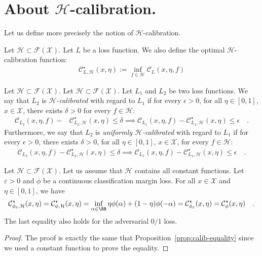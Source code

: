 \section{About $\mathcal{H}$-calibration.}

Let us  define more precisely the notion of $\mathcal{H}$-calibration.

\begin{defn}
Let $\mathcal{H}\subset \mathcal{F}(\mathcal{X})$. Let $L$ be a loss function. We also define the optimal $\mathcal{H}$-calibration function:
\begin{align*}
        \mathcal{C}^\star_{L,\mathcal{H}}(x,\eta):=\inf_{f\in\mathcal{H}}\mathcal{C}_L(x,\eta,f)
\end{align*}

\end{defn}



\begin{defn}
Let $\mathcal{H}\subset \mathcal{F}(\mathcal{X})$. Let $\mathcal{H}\subset \mathcal{F}(\mathcal{X})$. Let $L_1$ and $L_2$ be two loss functions. We say that $L_2$ is \emph{$\mathcal{H}$-calibrated} with regard to $L_1$ if for every $\epsilon>0$,  for all $\eta\in[0,1]$, $x\in\mathcal{X}$, there exists $ \delta>0$ for every $f\in\mathcal{H}$: 
\begin{align*}
    \mathcal{C}_{L_2}(x,\eta,f)- &\mathcal{C}^\star_{L_2,\mathcal{H}}(x,\eta)\leq\delta\implies\mathcal{C}_{L_1}(x,\eta,f)- \mathcal{C}^\star_{L_1,\mathcal{H}}(x,\eta)\leq \epsilon\quad.
\end{align*}
Furthermore, we say that $L_2$ is \emph{uniformly $\mathcal{H}$-calibrated} with regard to $L_1$ if for every $\epsilon>0$, there exists $ \delta>0$, for all $\eta\in[0,1]$, $x\in\mathcal{X}$, for every $f\in\mathcal{H}$: 
\begin{align*}
    \mathcal{C}_{L_2}(x,\eta,f)- \mathcal{C}^\star_{L_2,\mathcal{H}}(x,\eta)\leq\delta\implies\mathcal{C}_{L_1}(x,\eta,f)- \mathcal{C}^\star_{L_1,\mathcal{H}}(x,\eta)\leq \epsilon\quad.
\end{align*}
\end{defn}




\begin{prop*}
Let $\mathcal{H}\subset \mathcal{F}(\mathcal{X})$. Let us assume that $\mathcal{H}$ contains all constant functions. Let $\varepsilon>0$ and $\phi$ be a continuous classification margin loss.  For all $x\in\mathcal{X}$ and $\eta\in[0,1]$, we have
\begin{align*}
    \mathcal{C}^\star_{\phi_\varepsilon,\mathcal{H}}(x,\eta)=\mathcal{C}^\star_{\phi,\mathcal{H}}(x,\eta) =\inf_{\alpha\in\RR}\eta \phi(\alpha)+(1-\eta)\phi(-\alpha)= \mathcal{C}^\star_{\phi_\varepsilon}(x,\eta)=\mathcal{C}^\star_{\phi}(x,\eta)\quad.
\end{align*}
The last equality also holds for the adversarial $0/1$ loss.
\end{prop*}
\begin{proof}
The proof is exactly the same that Proposition~\ref{prop:calib-equality} since we used a constant function to prove the equality.
\end{proof}


